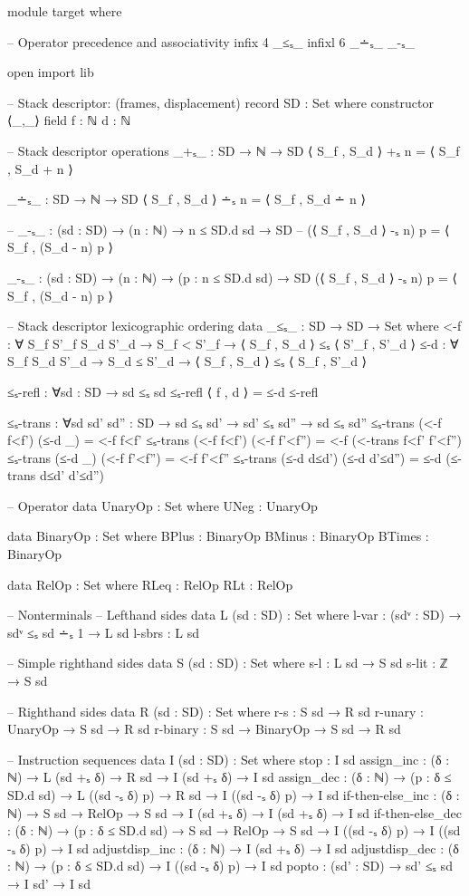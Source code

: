 \documentclass{article}
\begin{document}
\begin{code}
module target where

-- Operator precedence and associativity
infix 4 _≤ₛ_
infixl 6 _∸ₛ_ _-ₛ_

open import lib

-- Stack descriptor: (frames, displacement)
record SD : Set where
    constructor ⟨_,_⟩
    field
        f : ℕ
        d : ℕ

-- Stack descriptor operations    
_+ₛ_ : SD → ℕ → SD
⟨ S_f , S_d ⟩ +ₛ n = ⟨ S_f , S_d + n ⟩

_∸ₛ_ : SD → ℕ → SD
⟨ S_f , S_d ⟩ ∸ₛ n = ⟨ S_f , S_d ∸ n ⟩

-- _-ₛ_ : (sd : SD) → (n : ℕ) → n ≤ SD.d sd → SD
-- (⟨ S_f , S_d ⟩ -ₛ n) p = ⟨ S_f , (S_d - n) p ⟩

_-ₛ_ : (sd : SD) → (n : ℕ) → (p : n ≤ SD.d sd) → SD
(⟨ S_f , S_d ⟩ -ₛ n) p = ⟨ S_f , (S_d - n) p ⟩

-- Stack descriptor lexicographic ordering
data _≤ₛ_ : SD → SD → Set where
    <-f : ∀ {S_f S'_f S_d S'_d} → S_f < S'_f → ⟨ S_f , S_d ⟩ ≤ₛ ⟨ S'_f , S'_d ⟩
    ≤-d : ∀ {S_f S_d S'_d} → S_d ≤ S'_d → ⟨ S_f , S_d ⟩ ≤ₛ ⟨ S_f , S'_d ⟩

≤ₛ-refl : ∀{sd : SD} → sd ≤ₛ sd
≤ₛ-refl {⟨ f , d ⟩} = ≤-d ≤-refl

≤ₛ-trans : ∀{sd sd' sd'' : SD} → sd ≤ₛ sd' → sd' ≤ₛ sd'' → sd ≤ₛ sd''
≤ₛ-trans (<-f f<f') (≤-d _) =  <-f f<f'
≤ₛ-trans (<-f f<f') (<-f f'<f'') = <-f (<-trans f<f' f'<f'')
≤ₛ-trans (≤-d _) (<-f f'<f'') = <-f f'<f''
≤ₛ-trans (≤-d d≤d') (≤-d d'≤d'') = ≤-d (≤-trans d≤d' d'≤d'')


-- Operator
data UnaryOp : Set where 
    UNeg : UnaryOp

data BinaryOp : Set where
    BPlus : BinaryOp
    BMinus : BinaryOp
    BTimes : BinaryOp

data RelOp : Set where
    RLeq : RelOp
    RLt : RelOp

-- Nonterminals
-- Lefthand sides
data L (sd : SD) : Set where
    l-var : (sdᵛ : SD) → sdᵛ ≤ₛ sd ∸ₛ 1 → L sd
    l-sbrs : L sd

-- Simple righthand sides
data S (sd : SD) : Set where
    s-l : L sd → S sd
    s-lit : ℤ → S sd

-- Righthand sides
data R (sd : SD) : Set where
    r-s : S sd → R sd
    r-unary : UnaryOp → S sd → R sd
    r-binary : S sd → BinaryOp → S sd → R sd

-- Instruction sequences
data I (sd : SD) : Set where
    stop : I sd
    assign_inc : (δ : ℕ) → L (sd +ₛ δ) → R sd → I (sd +ₛ δ) → I sd
    assign_dec : (δ : ℕ) → (p : δ ≤ SD.d sd) → L ((sd -ₛ δ) p) → R sd → I ((sd -ₛ δ) p)  → I sd
    if-then-else_inc : (δ : ℕ) → S sd → RelOp → S sd → I (sd +ₛ δ) → I (sd +ₛ δ) → I sd
    if-then-else_dec : (δ : ℕ) → (p : δ ≤ SD.d sd) → S sd → RelOp → S sd → I ((sd -ₛ δ) p) → I ((sd -ₛ δ) p) → I sd
    adjustdisp_inc : (δ : ℕ) → I (sd +ₛ δ) → I sd
    adjustdisp_dec : (δ : ℕ) → (p : δ ≤ SD.d sd) → I ((sd -ₛ δ) p) → I sd
    popto : (sd' : SD) → sd' ≤ₛ sd → I sd' → I sd
\end{code}
\end{document}
